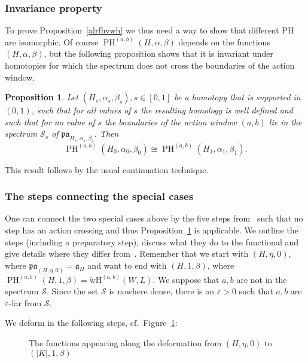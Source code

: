 \documentclass{amsart}
\newcommand{\Scal}{{\mathcal{S}}}
\newcommand{\acal}{\mathfrak{a}}
\newcommand{\pacal}{\mathfrak{pa}}
\newcommand{\PH}{\operatorname{PH}}
\newcommand{\WcheckH}{\operatorname{\check wH}}
\newtheorem{proposition}{Proposition}[section]
\theoremstyle{definition}
\theoremstyle{remark}
\numberwithin{equation}{section}
\begin{document}
\subsubsection*{Invariance property}
To prove Proposition~\ref{alrfhvwh} we thus need a way to show that different PH are isomorphic. Of course $\PH^{(a,b)}(H,\alpha,\beta)$ depends on the functions $(H,\alpha,\beta)$, but the following proposition shows that it is invariant under homotopies for which the spectrum does not cross the boundaries of the action window.

\begin{proposition}\label{Pinvariance} 
Let $(H_s,\alpha_s,\beta_s),s\in[0,1]$ be a homotopy that is supported in $(0,1)$, such that for all values of $s$ the resulting homology is well defined and such that for no value of $s$ the boundaries of the action window $(a,b)$ lie in the spectrum $\Scal_s$ of $\pacal_{H_s,\alpha_s,\beta_s}$. Then 
	\begin{equation*}
		\PH^{(a,b)}(H_0,\alpha_0,\beta_0)\cong \PH^{(a,b)}(H_1,\alpha_1,\beta_1).
	\end{equation*}
\end{proposition}
This result follows by the usual continuation technique. 

\subsubsection*{The steps connecting the special cases}
One can connect the two special cases above by the five steps from~\cite{CFO10} such that no step has an action crossing and thus Proposition~\ref{Pinvariance} is applicable. We outline the steps (including a preparatory step), discuss what they do to the functional and give details where they differ from~\cite{CFO10}. Remember that we start with $(H,\eta,0)$, where $\pacal_{(H,\eta,0)}=\acal_H$ and want to end with $(H,1,\beta)$, where $\PH^{(a,b)}(H,1,\beta)=\WcheckH^{(a,b)}(W,L)$. We suppose that $a,b$ are not in the spectrum $\Scal$. Since the set $\Scal$ is nowhere dense, there is an $\varepsilon>0$ such that $a,b$ are $\varepsilon$-far from $\Scal$. 

We deform in the following steps, cf.\ Figure~\ref{fig:deformations}:

\begin{figure}[h]
	\caption{The functions appearing along the deformation from $(H,\eta,0)$ to $(|K|,1,\beta)$}
	\label{fig:deformations}
\end{figure}
\end{document}
